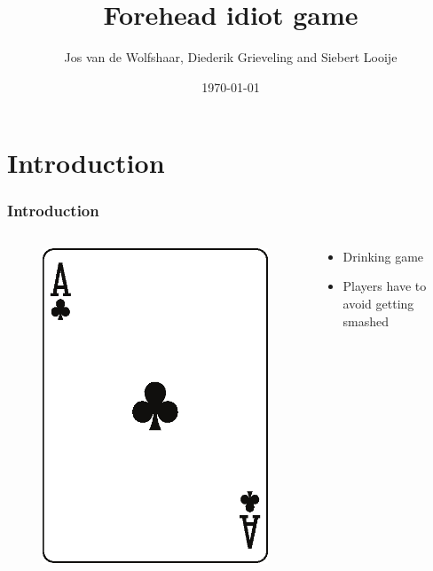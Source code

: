 \documentclass[10pt]{beamer}
\title{Forehead idiot game}
\date{\today}
\author{Jos van de Wolfshaar, Diederik Grieveling and Siebert Looije}
\institute{Multi agent systems}
\begin{document}
\maketitle

\section{Introduction}
\begin{frame}
 \frametitle{Introduction}
 \begin{columns}
  \begin{column}{3cm}
   \begin{figure}
    \includegraphics[width=\linewidth]{im/clubs_a.eps}
   \end{figure}
  \end{column}
  
  \begin{column}{7cm}
   \begin{itemize}[label=$\clubsuit$]
    \item Drinking game
    \item Players have to avoid getting smashed
   \end{itemize}
  \end{column}

 \end{columns}

\end{frame}
\end{document}
